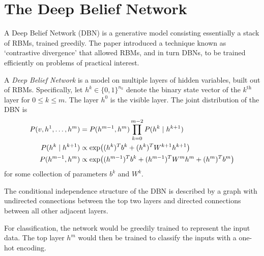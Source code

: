\documentclass[11pt,titlepage]{article}
\begin{document}
\section{The Deep Belief Network}
    A Deep Belief Network (DBN) is a generative model consisting essentially a
    stack of RBMs, trained greedily.  The paper \cite{Hin07} introduced a
    technique known as `contrastive divergence' that allowed RBMs, and in turn
    DBNs, to be trained efficiently on problems of practical interest.
    \begin{definition}
    A \emph{Deep Belief Network} is a model on multiple layers of hidden
    variables, built out of RBMs.  Specifically, let $h^k \in \{0,1\}^{n_k}$
    denote the binary state vector of the $k^{\text{th}}$ layer for $0 \le k \le
    m$.  The layer $h^0$ is the visible layer.  The joint distribution of the
    DBN is
    \begin{align*}
        P(v,h^1, \ldots, h^m) &= P(h^{m-1}, h^m) \prod_{k=0}^{m-2} P(h^k \mid h^{k+1})\\
        P(h^k\mid h^{k+1}) &\propto \exp\pdil*{(h^k)^Tb^k + (h^k)^T W^{k+1} h^{k+1}}\\
        P(h^{m-1}, h^{m}) &\propto  \exp\pdil*{(h^{m-1})^T b^k + (h^{m-1})^T W^m
        h^m + (h^m)^T b^m}
    \end{align*}
    for some collection of parameters $b^k$ and $W^k$.
    \end{definition}

    The conditional independence structure of the DBN is described by a graph
    with undirected connections between the top two layers and directed
    connections between all other adjacent layers.
    \begin{center}
    \end{center}
    For classification, the network would be greedily trained to represent the
    input data.  The top layer $h^m$ would then be trained to classify the
    inputs with a one-hot encoding.
\end{document}
